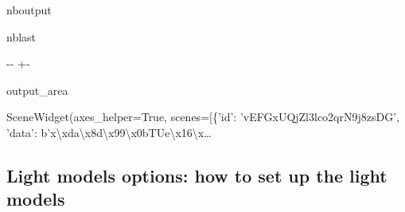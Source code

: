 \documentclass[letterpaper,10pt,english]{sphinxmanual}
\begin{document}
\begin{sphinxuseclass}{nboutput}
\begin{sphinxuseclass}{nblast}
{

\kern-\sphinxverbatimsmallskipamount\kern-\baselineskip
\kern+\FrameHeightAdjust\kern-\fboxrule
\vspace{\nbsphinxcodecellspacing}

\begin{sphinxuseclass}{output_area}
\begin{sphinxuseclass}{}


\begin{sphinxVerbatim}[commandchars=\\\{\}]
\llap{\color{nbsphinxout}[22]:\,\hspace{\fboxrule}\hspace{\fboxsep}}SceneWidget(axes\_helper=True, scenes=[\{'id': 'vEFGxUQjZl3lco2qrN9j8zsDG', 'data': b'x\textbackslash{}xda\textbackslash{}x8d\textbackslash{}x99\textbackslash{}x0bTUe\textbackslash{}x16\textbackslash{}x…
\end{sphinxVerbatim}



\end{sphinxuseclass}
\end{sphinxuseclass}
}

\end{sphinxuseclass}
\end{sphinxuseclass}
\sphinxstepscope


\subsection{Light models options: how to set up the light models}
\label{\detokenize{lightmodels_functionnalities:Light-models-options:-how-to-set-up-the-light-models}}\label{\detokenize{lightmodels_functionnalities::doc}}
\end{document}

